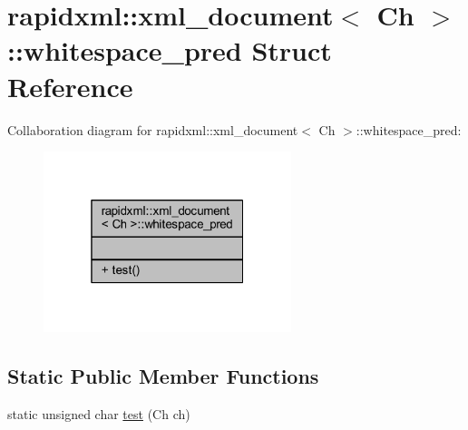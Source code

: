 \hypertarget{structrapidxml_1_1xml__document_1_1whitespace__pred}{\section{rapidxml\+:\+:xml\+\_\+document$<$ Ch $>$\+:\+:whitespace\+\_\+pred Struct Reference}
\label{structrapidxml_1_1xml__document_1_1whitespace__pred}
}


Collaboration diagram for rapidxml\+:\+:xml\+\_\+document$<$ Ch $>$\+:\+:whitespace\+\_\+pred\+:
\nopagebreak
\begin{figure}[H]
\begin{center}
\leavevmode
\includegraphics[width=205pt]{structrapidxml_1_1xml__document_1_1whitespace__pred__coll__graph}
\end{center}
\end{figure}
\subsection*{Static Public Member Functions}
\begin{DoxyCompactItemize}
\item 
static unsigned char \hyperlink{structrapidxml_1_1xml__document_1_1whitespace__pred_a1dca1a175c784b2ef0b83f3957e820eb}{test} (Ch ch)
\end{DoxyCompactItemize}


